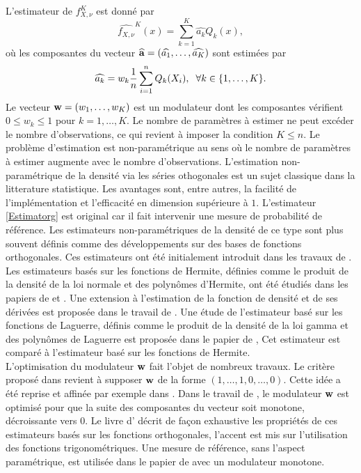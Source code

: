 L'estimateur de  $f_{X,\nu}^{K}$ est donné par 
\begin{equation}\label{Estimatorg}
\widehat{f_{X,\nu}}^{K}(x)=\sum_{k=1}^{K}\widehat{a_{k}}Q_{k}(x),
\end{equation}
où les composantes du vecteur $\widehat{\bold{a}}=(\widehat{a_{1}},\ldots,\widehat{a_{K}})$ sont estimées par 
\begin{equation}\label{EstimatorCoefficient}
\widehat{a_{k}}=w_{k}\frac{1}{n}\sum_{i=1}^{n}Q_{k}(X_{i}), \hspace{0.2cm}\forall k\in\{1,\ldots,K\}.
\end{equation}
Le vecteur $\bold{w}=(w_{1},\ldots,w_{K})$ est un modulateur dont les composantes vérifient $0\leq w_{k}\leq1$ pour $k=1,\ldots,K$. Le nombre de paramètres à estimer ne peut excéder le nombre d\rq{}observations, ce qui revient à imposer la condition $K\leq n$. Le problème d\rq{}estimation est non-paramétrique au sens où le nombre de paramètres à estimer augmente avec le nombre d\rq{}observations. L\rq{}estimation non-paramétrique de la densité via les séries othogonales est un sujet classique dans la litterature statistique. Les avantages sont, entre autres, la facilité de l'implémentation et l\rq{}efficacité en dimension supérieure à $1$. L\rq{}estimateur \eqref{Estimatorg} est original car il fait intervenir une mesure de probabilité de référence. Les estimateurs non-paramétriques de la densité de ce type sont plus souvent définis comme des développements sur des bases de fonctions orthogonales. Ces estimateurs ont été initialement introduit dans les travaux de \citet{Ce62}. Les estimateurs basés sur les fonctions de Hermite, définies comme le produit de la densité de la loi normale et des polynômes d\rq{}Hermite, ont été étudiés dans les papiers de \citet{Sc67} et \citet{Wa77}. Une extension à l\rq{}estimation de la fonction de densité et de ses dérivées est proposée dans le travail de \citet{GrPa84}. Une étude de l'estimateur basé sur les fonctions de Laguerre, définis comme le produit de la densité de la loi gamma et des polynômes de Laguerre est proposée dans le papier de \citet{Ha80}, Cet estimateur est comparé à l'estimateur basé sur les fonctions de Hermite.\\

L\rq{}optimisation du modulateur $\bold{w}$ fait l'objet de nombreux travaux. Le critère proposé dans \citet{KrTa68} revient à supposer $\bold{w}$ de la forme $(1,\ldots,1,0,\ldots,0)$. Cette idée a été reprise et affinée par exemple dans \citet{DiHa86}. Dans le travail de \citet{Wa69}, le modulateur $\bold{w}$ est optimisé pour que la suite des composantes du vecteur soit monotone, décroissante vers $0$. Le livre d\rq{}\citet{Ef99} décrit de façon exhaustive les propriétés de ces estimateurs basés sur les fonctions orthogonales, l\rq{}accent est mis sur l\rq{}utilisation des fonctions trigonométriques. Une mesure de référence, sans l\rq{}aspect paramétrique, est utilisée dans le papier de \citet{AnFi80} avec un modulateur monotone.\\

